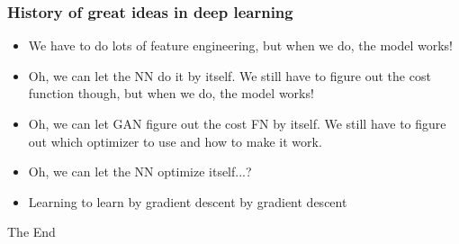 \documentclass{beamer}
\begin{document}
\begin{frame}
\frametitle{History of great ideas in deep learning}

\begin{itemize}
	\item We have to do lots of feature engineering, but when we do, the model works!
	\item Oh, we can let the NN do it by itself. We still have to figure out the cost function though, but when we do, the model works!
	\item Oh, we can let GAN figure out the cost FN by itself. We still have to figure out which optimizer to use and how to make it work.
	\item Oh, we can let the NN optimize itself...?
	\item Learning to learn by gradient descent by gradient descent
\end{itemize}

\end{frame}



\begin{frame}
\Huge{\centerline{The End}}
\end{frame}

\end{document}

